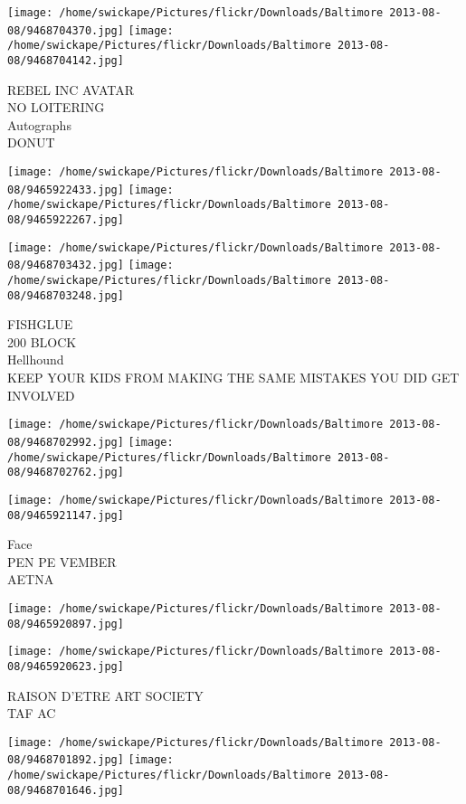 \documentclass[10pt,letterpaper]{article}
\begin{document}
\texttt{[image: /home/swickape/Pictures/flickr/Downloads/Baltimore 2013-08-08/9468704370.jpg]}
\texttt{[image: /home/swickape/Pictures/flickr/Downloads/Baltimore 2013-08-08/9468704142.jpg]}

REBEL INC AVATAR\\
NO LOITERING\\
Autographs\\
DONUT
\pagebreak

\texttt{[image: /home/swickape/Pictures/flickr/Downloads/Baltimore 2013-08-08/9465922433.jpg]}
\texttt{[image: /home/swickape/Pictures/flickr/Downloads/Baltimore 2013-08-08/9465922267.jpg]}

\texttt{[image: /home/swickape/Pictures/flickr/Downloads/Baltimore 2013-08-08/9468703432.jpg]}
\texttt{[image: /home/swickape/Pictures/flickr/Downloads/Baltimore 2013-08-08/9468703248.jpg]}

FISHGLUE\\
200 BLOCK\\
Hellhound\\
KEEP YOUR KIDS FROM MAKING THE SAME MISTAKES YOU DID GET INVOLVED
\pagebreak

\texttt{[image: /home/swickape/Pictures/flickr/Downloads/Baltimore 2013-08-08/9468702992.jpg]}
\texttt{[image: /home/swickape/Pictures/flickr/Downloads/Baltimore 2013-08-08/9468702762.jpg]}

\texttt{[image: /home/swickape/Pictures/flickr/Downloads/Baltimore 2013-08-08/9465921147.jpg]}

Face\\
PEN PE VEMBER\\
AETNA
\pagebreak

\texttt{[image: /home/swickape/Pictures/flickr/Downloads/Baltimore 2013-08-08/9465920897.jpg]}

\vspace{0.25in}
\texttt{[image: /home/swickape/Pictures/flickr/Downloads/Baltimore 2013-08-08/9465920623.jpg]}

RAISON D'ETRE ART SOCIETY\\
TAF AC
\pagebreak

\texttt{[image: /home/swickape/Pictures/flickr/Downloads/Baltimore 2013-08-08/9468701892.jpg]}
\texttt{[image: /home/swickape/Pictures/flickr/Downloads/Baltimore 2013-08-08/9468701646.jpg]}
\end{document}
